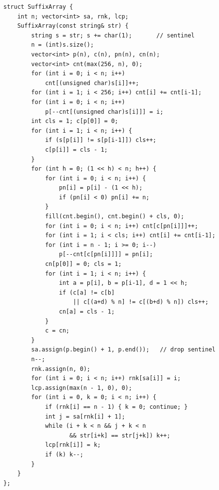 \begin{lstlisting}
struct SuffixArray {
    int n; vector<int> sa, rnk, lcp;
    SuffixArray(const string& str) {
        string s = str; s += char(1);       // sentinel
        n = (int)s.size();
        vector<int> p(n), c(n), pn(n), cn(n);
        vector<int> cnt(max(256, n), 0);
        for (int i = 0; i < n; i++)
            cnt[(unsigned char)s[i]]++;
        for (int i = 1; i < 256; i++) cnt[i] += cnt[i-1];
        for (int i = 0; i < n; i++)
            p[--cnt[(unsigned char)s[i]]] = i;
        int cls = 1; c[p[0]] = 0;
        for (int i = 1; i < n; i++) {
            if (s[p[i]] != s[p[i-1]]) cls++;
            c[p[i]] = cls - 1;
        }
        for (int h = 0; (1 << h) < n; h++) {
            for (int i = 0; i < n; i++) {
                pn[i] = p[i] - (1 << h);
                if (pn[i] < 0) pn[i] += n;
            }
            fill(cnt.begin(), cnt.begin() + cls, 0);
            for (int i = 0; i < n; i++) cnt[c[pn[i]]]++;
            for (int i = 1; i < cls; i++) cnt[i] += cnt[i-1];
            for (int i = n - 1; i >= 0; i--)
                p[--cnt[c[pn[i]]]] = pn[i];
            cn[p[0]] = 0; cls = 1;
            for (int i = 1; i < n; i++) {
                int a = p[i], b = p[i-1], d = 1 << h;
                if (c[a] != c[b]
                    || c[(a+d) % n] != c[(b+d) % n]) cls++;
                cn[a] = cls - 1;
            }
            c = cn;
        }
        sa.assign(p.begin() + 1, p.end());   // drop sentinel
        n--;
        rnk.assign(n, 0);
        for (int i = 0; i < n; i++) rnk[sa[i]] = i;
        lcp.assign(max(n - 1, 0), 0);
        for (int i = 0, k = 0; i < n; i++) {
            if (rnk[i] == n - 1) { k = 0; continue; }
            int j = sa[rnk[i] + 1];
            while (i + k < n && j + k < n
                   && str[i+k] == str[j+k]) k++;
            lcp[rnk[i]] = k;
            if (k) k--;
        }
    }
};
\end{lstlisting}



